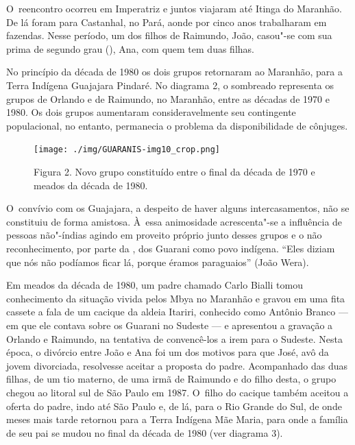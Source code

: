 O~reencontro ocorreu em Imperatriz e juntos viajaram até Itinga do
Maranhão. De lá foram para Castanhal, no Pará, aonde por cinco anos
trabalharam em fazendas. Nesse período, um dos filhos de Raimundo, João,
casou"-se com sua prima de segundo grau (), Ana, com quem tem duas
filhas.

No princípio da década de 1980 os dois grupos retornaram ao Maranhão,
para a Terra Indígena Guajajara Pindaré. No diagrama 2, o sombreado
representa os grupos de Orlando e de Raimundo, no Maranhão, entre as
décadas de 1970 e 1980. Os dois grupos aumentaram consideravelmente seu
contingente populacional, no entanto, permanecia o problema da
disponibilidade de cônjuges.

\begin{figure}[!hb]
  \centering
 \texttt{[image: ./img/GUARANIS-img10\_crop.png]}	
  \hfill
  \caption{Figura 2. Novo grupo constituído entre o final da década de 1970 e meados da década de 1980.}
\end{figure}
 
 

O~convívio com os Guajajara, a despeito de haver alguns intercasamentos,
não se constituiu de forma amistosa. À~essa animosidade acrescenta"-se a
influência de pessoas não"-índias agindo em proveito próprio junto
desses grupos
e o não reconhecimento, por parte da
, dos Guarani como povo indígena. ``Eles diziam que nós não
podíamos ficar lá, porque éramos paraguaios'' (João Wera). 

Em meados da década de 1980, um padre chamado Carlo Bialli tomou
conhecimento da situação vivida pelos Mbya no Maranhão e gravou em uma
fita cassete a fala de um cacique da aldeia Itariri, conhecido como
Antônio Branco --- em que ele contava sobre os Guarani no Sudeste --- e
apresentou a gravação a Orlando e Raimundo, na tentativa de
convencê-los a irem para o Sudeste. Nesta época, o divórcio entre João
e Ana foi um dos motivos para que José, avô da jovem divorciada,
resolvesse aceitar a proposta do padre. Acompanhado das duas filhas, de
um tio materno, de uma irmã de Raimundo e do filho desta, o grupo
chegou ao litoral sul de São Paulo em 1987. O~filho do cacique também
aceitou a oferta do padre, indo até São Paulo e, de lá, para o Rio
Grande do Sul, de onde meses mais tarde retornou para a Terra Indígena
Mãe Maria, para onde a família de seu pai se mudou no final da década
de 1980 (ver diagrama 3).

